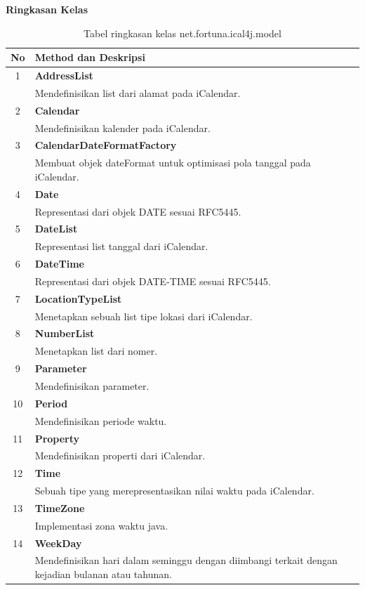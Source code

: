 	\noindent \textbf{Ringkasan Kelas}\cite{ical}
	\begin{table}[H]
		\centering
		\caption{Tabel ringkasan kelas net.fortuna.ical4j.model}
		\label{tab:kelas_net.fortuna.ical4j.model}
	\begin{tabular}{|c|p{12cm}|}
		\hline
		\textbf{No} & \textbf{Method dan Deskripsi} \\ \hline \hline
		1 & \textbf{AddressList}\\
			&	Mendefinisikan list dari alamat pada iCalendar.\\ \hline
		2 & \textbf{Calendar}\\
			&	Mendefinisikan kalender pada iCalendar. \\ \hline
		3 & \textbf{CalendarDateFormatFactory}\\
			&	Membuat objek dateFormat untuk optimisasi pola tanggal pada iCalendar.\\ \hline
		4 & \textbf{Date}\\
			&	Representasi dari objek DATE sesuai RFC5445.\\ \hline
		5 & \textbf{DateList}\\
			&	Representasi list tanggal dari iCalendar.\\ \hline
		6 & \textbf{DateTime}\\
			&	Representasi dari objek DATE-TIME sesuai RFC5445.\\ \hline
		7 & \textbf{LocationTypeList}\\
			&	Menetapkan sebuah list tipe lokasi dari iCalendar.\\ \hline
		8 & \textbf{NumberList}\\
			&	Menetapkan list dari nomer.\\ \hline
		9 & \textbf{Parameter}\\
			&	Mendefinisikan parameter.\\ \hline
		10 & \textbf{Period}\\
			&	Mendefinisikan periode waktu.\\ \hline
		11 & \textbf{Property}\\
			&	Mendefinisikan properti dari iCalendar.\\ \hline		12 & \textbf{Time}\\
			&	Sebuah tipe yang merepresentasikan nilai waktu pada iCalendar.\\ \hline
		13 & \textbf{TimeZone}\\
			&	Implementasi zona waktu java.\\ \hline
		14 & \textbf{WeekDay}\\
			&	Mendefinisikan hari dalam seminggu dengan diimbangi terkait dengan kejadian bulanan atau tahunan.\\ \hline	
	\end{tabular}
\end{table}
	
